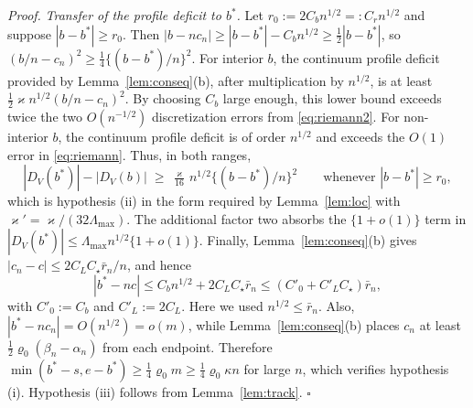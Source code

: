 \documentclass[12pt, a4paper]{article}
\newcommand{\qed}{\hfill$\square$}
\newenvironment{proof}[1][Proof]{\par\noindent\textit{#1.}\space}{\qed\par\medskip}
\begin{document}
\begin{proof}
\emph{Transfer of the profile deficit to $b^*$.} Let
$r_0:=2C_bn^{1/2}=:C_rn^{1/2}$ and suppose $|b-b^*|\ge r_0$. Then
$|b-nc_n|\ge|b-b^*|-C_bn^{1/2}\ge\tfrac12|b-b^*|$, so
$(b/n-c_n)^2\ge\tfrac14\{(b-b^*)/n\}^2$. For interior $b$, the continuum
profile deficit provided by Lemma~\ref{lem:conseq}(b), after multiplication by
$n^{1/2}$, is at least
$\tfrac12\varkappa n^{1/2}(b/n-c_n)^2$. By choosing $C_b$ large enough, this
lower bound exceeds twice the two $O(n^{-1/2})$ discretization errors from
\eqref{eq:riemann2}. For non-interior $b$, the continuum profile deficit is of
order $n^{1/2}$ and exceeds the $O(1)$ error in \eqref{eq:riemann}. Thus, in
both ranges,
\[
|D_V(b^*)| - |D_V(b)| \;\ge\; \tfrac{\varkappa}{16}\, n^{1/2} \big\{(b-b^*)/n\big\}^2
\qquad\text{whenever } |b-b^*| \ge r_0 ,
\]
which is hypothesis (ii) in the form required by Lemma~\ref{lem:loc} with
$\varkappa'=\varkappa/(32\Lambda_{\max})$. The additional factor two absorbs
the $\{1+o(1)\}$ term in
$|D_V(b^*)|\le\Lambda_{\max}n^{1/2}\{1+o(1)\}$. Finally,
Lemma~\ref{lem:conseq}(b) gives
$|c_n-c|\le2C_LC_\star\bar r_n/n$, and hence
\[
|b^*-nc|\le C_bn^{1/2}+2C_LC_\star\bar r_n
\le(C'_0+C'_LC_\star)\bar r_n,
\]
with $C'_0:=C_b$ and $C'_L:=2C_L$. Here we used
$n^{1/2}\le\bar r_n$. Also,
$|b^*-nc_n|=O(n^{1/2})=o(m)$, while Lemma~\ref{lem:conseq}(b) places $c_n$
at least $\tfrac12\varrho_0(\beta_n-\alpha_n)$ from each endpoint. Therefore
$\min(b^*-s,e-b^*)\ge\tfrac14\varrho_0m
\ge\tfrac14\varrho_0\kappa n$ for large $n$, which verifies hypothesis (i).
Hypothesis (iii) follows from Lemma~\ref{lem:track}.
\end{proof}
\end{document}
